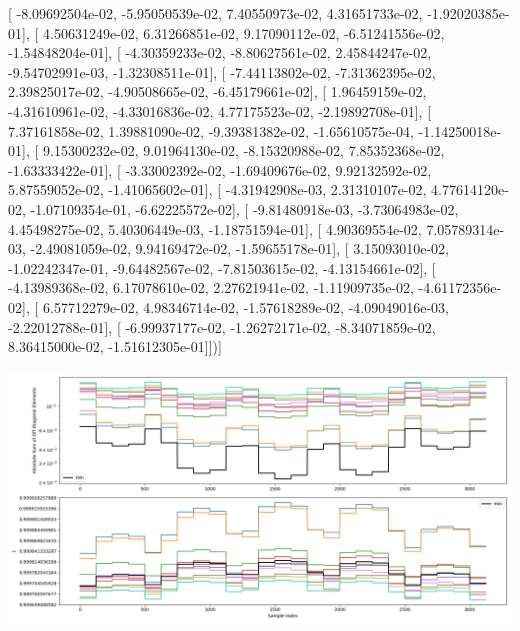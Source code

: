 \documentclass{article}
\begin{document}
       [ -8.09692504e-02,  -5.95050539e-02,   7.40550973e-02,
          4.31651733e-02,  -1.92020385e-01],
       [  4.50631249e-02,   6.31266851e-02,   9.17090112e-02,
         -6.51241556e-02,  -1.54848204e-01],
       [ -4.30359233e-02,  -8.80627561e-02,   2.45844247e-02,
         -9.54702991e-03,  -1.32308511e-01],
       [ -7.44113802e-02,  -7.31362395e-02,   2.39825017e-02,
         -4.90508665e-02,  -6.45179661e-02],
       [  1.96459159e-02,  -4.31610961e-02,  -4.33016836e-02,
          4.77175523e-02,  -2.19892708e-01],
       [  7.37161858e-02,   1.39881090e-02,  -9.39381382e-02,
         -1.65610575e-04,  -1.14250018e-01],
       [  9.15300232e-02,   9.01964130e-02,  -8.15320988e-02,
          7.85352368e-02,  -1.63333422e-01],
       [ -3.33002392e-02,  -1.69409676e-02,   9.92132592e-02,
          5.87559052e-02,  -1.41065602e-01],
       [ -4.31942908e-03,   2.31310107e-02,   4.77614120e-02,
         -1.07109354e-01,  -6.62225572e-02],
       [ -9.81480918e-03,  -3.73064983e-02,   4.45498275e-02,
          5.40306449e-03,  -1.18751594e-01],
       [  4.90369554e-02,   7.05789314e-03,  -2.49081059e-02,
          9.94169472e-02,  -1.59655178e-01],
       [  3.15093010e-02,  -1.02242347e-01,  -9.64482567e-02,
         -7.81503615e-02,  -4.13154661e-02],
       [ -4.13989368e-02,   6.17078610e-02,   2.27621941e-02,
         -1.11909735e-02,  -4.61172356e-02],
       [  6.57712279e-02,   4.98346714e-02,  -1.57618289e-02,
         -4.09049016e-03,  -2.22012788e-01],
       [ -6.99937177e-02,  -1.26272171e-02,  -8.34071859e-02,
          8.36415000e-02,  -1.51612305e-01]])]
\begin{center}
\includegraphics[scale=.9]{report_pickled_controls252/control_dpn_all.png}

\end{center}
\end{document}
